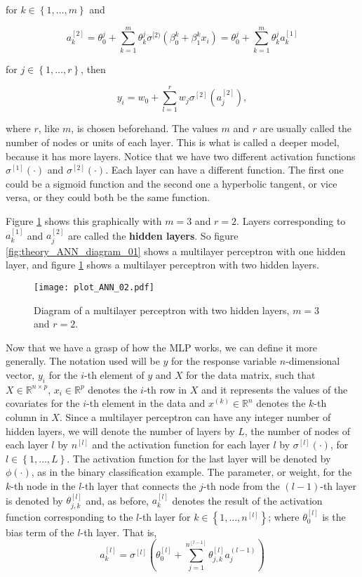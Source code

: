 for $k \in \left\{ 1, \ldots, m \right\}$ and

$$
a_k^{[2]} = \theta_0^{j} +  \sum_{k = 1}^m \theta_k^{j} \sigma^{[2)} \left( \beta_0^{k} + \beta_1^{k} x_i \right) =
\theta_0^{j} +  \sum_{k = 1}^m \theta_k^{j} a_k^{[1]}
$$

for $j \in \left\{ 1, \ldots, r \right\}$, then

$$
y_i = w_0 + \sum_{l = 1}^r w_j \sigma^{[2]} \left( a_j^{[2]} \right),
$$

where $r$, like $m$, is chosen beforehand. The values $m$ and $r$ are usually called the number of nodes or units of each layer. This is what is called a deeper model, because it has more layers. Notice that we have two different activation functions $\sigma^{[1]}(\cdot)$ and $\sigma^{[2]}(\cdot)$. Each layer can have a different function. The first one could be a sigmoid function and the second one a hyperbolic tangent, or vice versa, or they could both be the same function.

Figure \ref{fig:theory_ANN_diagram_02} shows this graphically with $m = 3$ and $r = 2$. Layers corresponding to $a_k^{[1]}$ and $a_j^{[2]}$ are called the \textbf{hidden layers}. So figure \ref{fig:theory_ANN_diagram_01} shows a multilayer perceptron with one hidden layer, and figure \ref{fig:theory_ANN_diagram_02} shows a multilayer perceptron with two hidden layers.


\begin{figure}[H]
    \centering
    \texttt{[image: plot\_ANN\_02.pdf]}
    \caption{Diagram of a multilayer perceptron with two hidden layers, $m = 3$ and $r = 2$.}
    \label{fig:theory_ANN_diagram_02}
\end{figure}

Now that we have a grasp of how the MLP works, we can define it more generally. The notation used will be $y$ for the response variable $n$-dimensional vector, $y_i$ for the $i$-th element of $y$ and $X$ for the data matrix, such that $X \in \mathbb{R}^{n \times p}$, $x_i \in \mathbb{R}^p$ denotes the $i$-th row in $X$ and it represents the values of the covariates for the $i$-th element in the data and $x^{(k)} \in \mathbb{R}^n$ denotes the $k$-th column in $X$. Since a multilayer perceptron can have any integer number of hidden layers, we will denote the number of layers by $L$, the number of nodes of each layer $l$ by $n^{[l]}$ and the activation function for each layer $l$ by $\sigma^{[l]}(\cdot)$, for $l \in \left\{ 1, \ldots, L \right\}$. The activation function for the last layer will be denoted by $\phi(\cdot)$, as in the binary classification example.
The parameter, or weight, for the $k$-th node in the $l$-th layer that connects the $j$-th node from the $(l-1)$-th layer is denoted by $\theta_{j,k}^{[l]}$ and, as before, $a_k^{[l]}$ denotes the result of the activation function corresponding to the $l$-th layer for $k \in \left\{ 1, \ldots, n^{[l]} \right\}$; where $\theta_0^{[l]}$ is the bias term of the $l$-th layer. That is,
$$
  a_k^{[l]} = \sigma^{[l]} \left( \theta_0^{[l]} + \sum_{j = 1}^{n^{[l-1]}} \theta_{j,k}^{[l]} a_j^{(l-1)} \right)
$$

